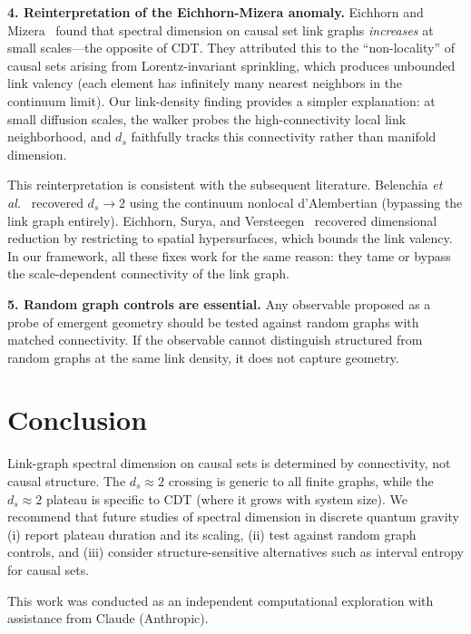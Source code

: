 \documentclass[aps,prd,twocolumn,superscriptaddress,nofootinbib]{revtex4-2}
\begin{document}
\textbf{4. Reinterpretation of the Eichhorn-Mizera anomaly.} Eichhorn and Mizera~\cite{eichhorn2014} found that spectral dimension on causal set link graphs \emph{increases} at small scales---the opposite of CDT. They attributed this to the ``non-locality'' of causal sets arising from Lorentz-invariant sprinkling, which produces unbounded link valency (each element has infinitely many nearest neighbors in the continuum limit). Our link-density finding provides a simpler explanation: at small diffusion scales, the walker probes the high-connectivity local link neighborhood, and $d_s$ faithfully tracks this connectivity rather than manifold dimension.

This reinterpretation is consistent with the subsequent literature. Belenchia \emph{et al.}~\cite{belenchia2016} recovered $d_s \to 2$ using the continuum nonlocal d'Alembertian (bypassing the link graph entirely). Eichhorn, Surya, and Versteegen~\cite{eichhorn2019} recovered dimensional reduction by restricting to spatial hypersurfaces, which bounds the link valency. In our framework, all these fixes work for the same reason: they tame or bypass the scale-dependent connectivity of the link graph.

\textbf{5. Random graph controls are essential.} Any observable proposed as a probe of emergent geometry should be tested against random graphs with matched connectivity. If the observable cannot distinguish structured from random graphs at the same link density, it does not capture geometry.

\section{Conclusion}

Link-graph spectral dimension on causal sets is determined by connectivity, not causal structure. The $d_s \approx 2$ crossing is generic to all finite graphs, while the $d_s \approx 2$ plateau is specific to CDT (where it grows with system size). We recommend that future studies of spectral dimension in discrete quantum gravity (i) report plateau duration and its scaling, (ii) test against random graph controls, and (iii) consider structure-sensitive alternatives such as interval entropy for causal sets.

\begin{acknowledgments}
This work was conducted as an independent computational exploration with assistance from Claude (Anthropic).
\end{acknowledgments}
\end{document}
